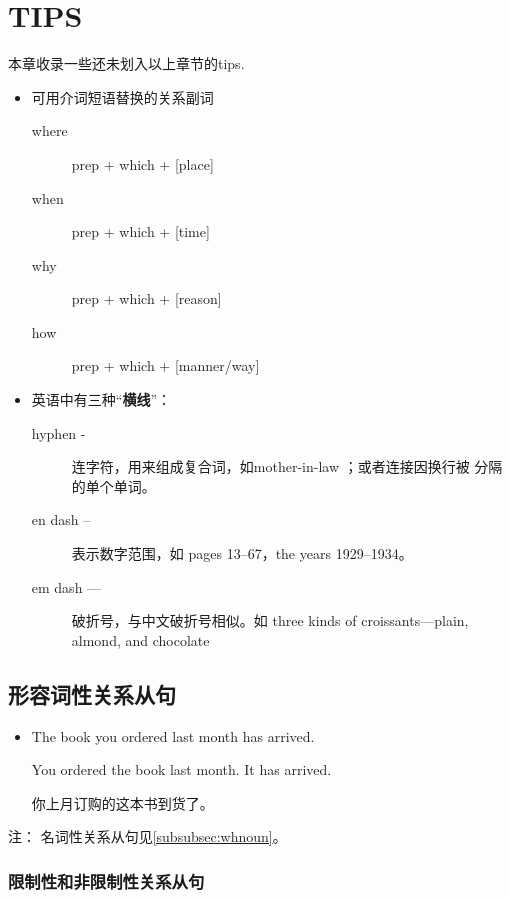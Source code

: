 \chapter{TIPS}

本章收录一些还未划入以上章节的tips.


\begin{itemize}

\item 可用介词短语替换的关系副词
  \begin{description}
  \item[where] prep + which + [place]
  \item[when] prep + which + [time]
  \item[why] prep + which + [reason]
  \item[how] prep + which + [manner/way]
  \end{description}
\item 英语中有三种“\textbf{横线}”：
  \begin{description}
  \item[hyphen -] 连字符，用来组成复合词，如mother-in-law ；或者连接因换行被
    分隔的单个单词。

  \item[en dash --] 表示数字范围，如 pages 13--67，the years 1929--1934。

  \item[em dash ---] 破折号，与中文破折号相似。如 three kinds of croissants---plain, almond, and chocolate
  \end{description}

\end{itemize}



\section{形容词性关系从句}

\begin{itemize}
\item The book  you ordered last month has arrived.

  You ordered the book last month. It has arrived.

  你上月订购的这本书到货了。
\end{itemize}

注： 名词性关系从句见\cref{subsubsec:whnoun}。

\subsection{限制性和非限制性关系从句}




